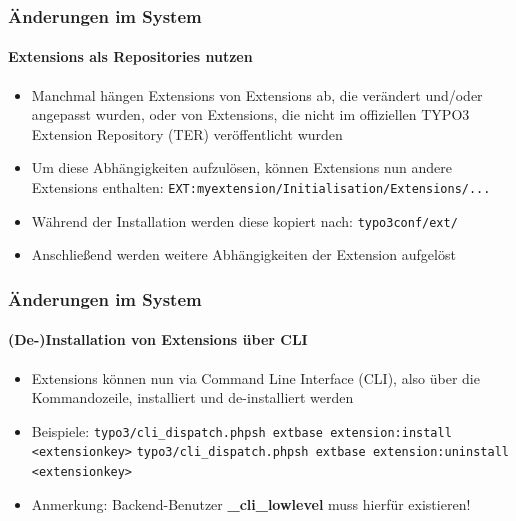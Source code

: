 
\begin{frame}[fragile]
	\frametitle{Änderungen im System}
	\framesubtitle{Extensions als Repositories nutzen}

	\begin{itemize}
		\item Manchmal hängen Extensions von Extensions ab, die verändert und/oder angepasst wurden,
			oder von Extensions, die nicht im offiziellen TYPO3 Extension Repository (TER) veröffentlicht wurden
		\item Um diese Abhängigkeiten aufzulösen, können Extensions nun andere Extensions enthalten:\newline
			\texttt{EXT:myextension/Initialisation/Extensions/...}
		\item Während der Installation werden diese kopiert nach:\newline
			\texttt{typo3conf/ext/}
		\item Anschließend werden weitere Abhängigkeiten der Extension aufgelöst
	\end{itemize}

\end{frame}


\begin{frame}[fragile]
	\frametitle{Änderungen im System}
	\framesubtitle{(De-)Installation von Extensions über CLI}

	\begin{itemize}
		\item Extensions können nun via Command Line Interface (CLI), also über die Kommandozeile, installiert und de-installiert werden
		\item Beispiele:
			\lstinline!typo3/cli_dispatch.phpsh extbase extension:install <extensionkey>!
			\lstinline!typo3/cli_dispatch.phpsh extbase extension:uninstall <extensionkey>!

		\item Anmerkung: Backend-Benutzer \textbf{\_cli\_lowlevel} muss hierfür existieren!
	\end{itemize}

\end{frame}

